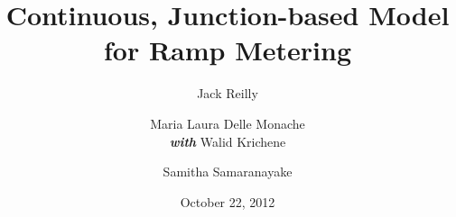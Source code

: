 \author[Reilly, Delle Monache et al]{Jack Reilly \and Maria Laura Delle Monache \\ \textbf{\emph{with}} Walid Krichene \and Samitha Samaranayake}
\title[Continuous model for Ramp Metering]{Continuous, Junction-based Model for Ramp Metering}

\date{October 22, 2012}